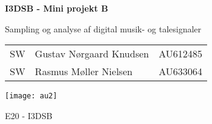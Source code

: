 \documentclass{article}
\begin{document}

\begin{titlepage}
  \begin{center}
    \vspace*{1cm}
    \Huge
    \textbf{I3DSB - Mini projekt B}

    \vspace{0.5cm}

    \huge
    Sampling og analyse af digital musik- og talesignaler \\
    \date\today

    \vfill

    \Large
    \begin{tabular}{llr}
      SW & Gustav Nørgaard Knudsen  & AU612485 \\
      SW & Rasmus Møller Nielsen    & AU633064 \\
    \end{tabular}
    
    \vfill

    \texttt{[image: au2]}

    \vspace{2cm}
    
    \large
    E20 - I3DSB
  \end{center}
\end{titlepage}

\newpage

\tableofcontents

\newpage

\setcounter{page}{1}






\end{document}
